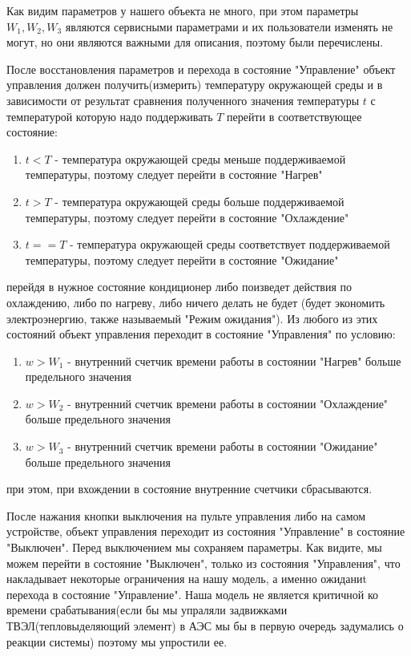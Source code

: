 \documentclass[12pt, twoside]{report}
\begin{document}
Как видим параметров у нашего объекта не много, при этом параметры $W_1, W_2, W_3$ являются сервисными параметрами и их пользователи изменять 
не могут, но они являются важными для описания, поэтому были перечислены.

После восстановления параметров и перехода в состояние "Управление" объект управления должен получить(измерить) температуру окружающей среды
и в зависимости от результат сравнения полученного значения температуры $t$ с температурой которую надо поддерживать $T$ перейти в 
соответствующее состояние:
  \begin{enumerate}
    \item $t < T$  - температура окружающей среды меньше поддерживаемой температуры, поэтому следует перейти в состояние "Нагрев"
    \item $t > T$  - температура окружающей среды больше поддерживаемой температуры, поэтому следует перейти в состояние "Охлаждение"
    \item $t == T$ - температура окружающей среды соответствует поддерживаемой температуры, поэтому следует перейти в состояние "Ожидание"
  \end{enumerate} 
перейдя в нужное состояние кондиционер либо поизведет действия по охлаждению, либо по нагреву, либо ничего делать не будет
(будет экономить электроэнергию, также называемый "Режим ожидания"). Из любого из этих состояний объект управления переходит в состояние "Управления" 
по условию:
  \begin{enumerate}
    \item $w > W_1$  - внутренний счетчик времени работы в состоянии "Нагрев" больше предельного значения
    \item $w > W_2$  - внутренний счетчик времени работы в состоянии "Охлаждение" больше предельного значения
    \item $w > W_3$  - внутренний счетчик времени работы в состоянии "Ожидание" больше предельного значения
  \end{enumerate} 
при этом, при вхождении в состояние внутренние счетчики сбрасываются.

После нажания кнопки выключения на пульте управления либо на самом устройстве, объект управления переходит из состояния "Управление" 
в состояние "Выключен". Перед выключением мы сохраняем параметры. Как видите, мы можем перейти в состояние "Выключен", только из состояния 
"Управления", что накладывает некоторые ограничения на нашу модель, а именно ожиданиt перехода в состояние "Управление". Наша модель
не является критичной ко времени срабатывания(если бы мы упраляли задвижками ТВЭЛ(тепловыделяющий элемент) в АЭС мы бы в первую очередь 
задумались о реакции системы) поэтому мы упростили ее.
\end{document}
